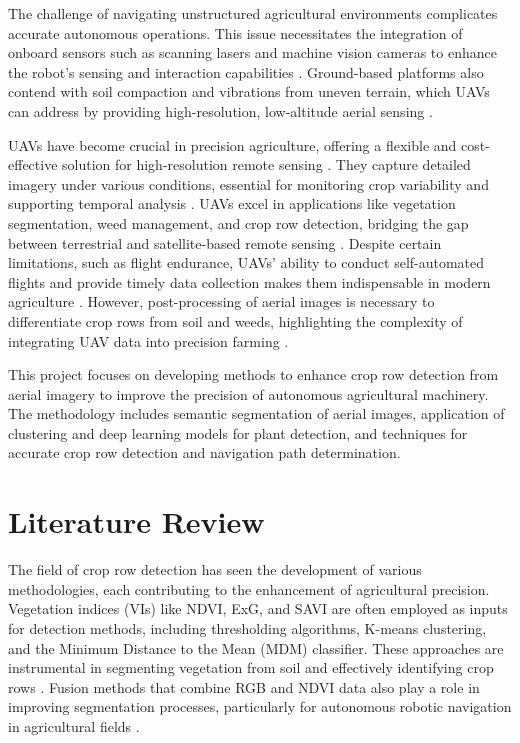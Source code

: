 \documentclass[conference]{IEEEtran}
\begin{document}
The challenge of navigating unstructured agricultural environments complicates accurate autonomous operations. This issue necessitates the integration of onboard sensors such as scanning lasers and machine vision cameras to enhance the robot's sensing and interaction capabilities \cite{b2,b3}. Ground-based platforms also contend with soil compaction and vibrations from uneven terrain, which UAVs can address by providing high-resolution, low-altitude aerial sensing \cite{b10}.

UAVs have become crucial in precision agriculture, offering a flexible and cost-effective solution for high-resolution remote sensing \cite{b9,b12}. They capture detailed imagery under various conditions, essential for monitoring crop variability and supporting temporal analysis \cite{b10,b12}. UAVs excel in applications like vegetation segmentation, weed management, and crop row detection, bridging the gap between terrestrial and satellite-based remote sensing \cite{b7,b13}. Despite certain limitations, such as flight endurance, UAVs' ability to conduct self-automated flights and provide timely data collection makes them indispensable in modern agriculture \cite{b11,b13}. However, post-processing of aerial images is necessary to differentiate crop rows from soil and weeds, highlighting the complexity of integrating UAV data into precision farming \cite{b6}.

This project focuses on developing methods to enhance crop row detection from aerial imagery to improve the precision of autonomous agricultural machinery. The methodology includes semantic segmentation of aerial images, application of clustering and deep learning models for plant detection, and techniques for accurate crop row detection and navigation path determination.

\section{Literature Review}
The field of crop row detection has seen the development of various methodologies, each contributing to the enhancement of agricultural precision. Vegetation indices (VIs) like NDVI, ExG, and SAVI are often employed as inputs for detection methods, including thresholding algorithms, K-means clustering, and the Minimum Distance to the Mean (MDM) classifier. These approaches are instrumental in segmenting vegetation from soil and effectively identifying crop rows \cite{b1,b6,b13}. Fusion methods that combine RGB and NDVI data also play a role in improving segmentation processes, particularly for autonomous robotic navigation in agricultural fields \cite{b5}.
\end{document}
